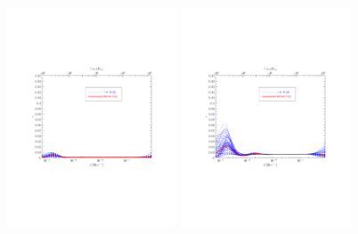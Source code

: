 \documentclass[11pt]{article}
\def \halffigwidth{0.45\textwidth}
\begin{document}
\begin{figure}
  \includegraphics[width=\halffigwidth,  trim = 1in 2.9in 1in 2.9in]{nobicep_spline0_p11_r0d02_eps_traj.pdf}%
  \includegraphics[width=\halffigwidth,  trim = 1in 2.9in 1in 2.9in]{nobicep_spline0_p11_r0d1_eps_traj.pdf}

\end{figure}
\end{document}
